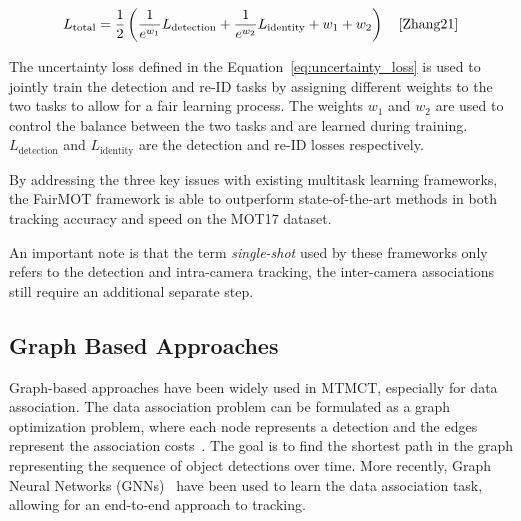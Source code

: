 \begin{equation}
	\label{eq:uncertainty_loss}
	L_{\text{total}}=\frac{1}{2}\left(\frac{1}{e^{w_1}} L_{\text{detection}}+\frac{1}{e^{w_2}} L_{\text{identity}}+w_1+w_2\right)
	\quad\text{\cite[Eq.~5]{Zhang21}}
\end{equation}

The uncertainty loss defined in the Equation~\ref{eq:uncertainty_loss} is used to jointly train the detection and re-ID tasks by assigning different weights to the two tasks to allow for a fair learning process. The weights \(w_1\) and \(w_2\) are used to control the balance between the two tasks and are learned during training. \(L_{\text{detection}}\) and \(L_{\text{identity}}\) are the detection and re-ID losses respectively.

By addressing the three key issues with existing multitask learning frameworks, the FairMOT framework is able to outperform state-of-the-art methods in both tracking accuracy and speed on the MOT17 dataset.

An important note is that the term \textit{single-shot} used by these frameworks only refers to the detection and intra-camera tracking, the inter-camera associations still require an additional separate step.

\subsection{Graph Based Approaches}\label{subsec:graph_based_approaches}
Graph-based approaches have been widely used in MTMCT, especially for data association. The data association problem can be formulated as a graph optimization problem, where each node represents a detection and the edges represent the association costs~\cite{Zhang08}. The goal is to find the shortest path in the graph representing the sequence of object detections over time. More recently, Graph Neural Networks (GNNs)~\cite{Scarselli09} have been used to learn the data association task, allowing for an end-to-end approach to tracking.

